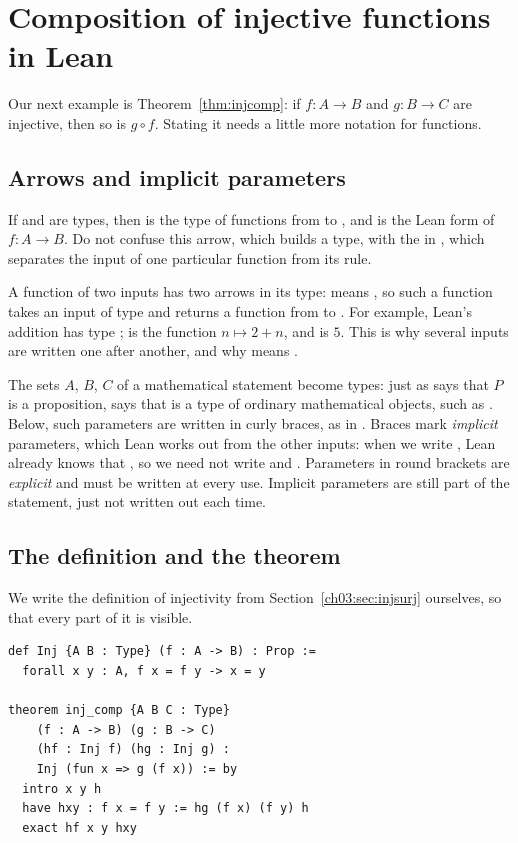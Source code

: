 \section{Composition of injective functions in Lean}\label{ch15:sec:injcomp}
Our next example is Theorem~\ref{thm:injcomp}: if $f:A\to B$ and $g:B\to C$ are injective, then so is $g\circ f$. Stating it needs a little more notation for functions.

\subsection*{Arrows and implicit parameters}
If  and  are types, then  is the type of functions from  to , and  is the Lean form of $f:A\to B$. Do not confuse this arrow, which builds a type, with the \code{=>} in , which separates the input of one particular function from its rule.

A function of two inputs has two arrows in its type:  means , so such a function takes an input of type  and returns a function from  to . For example, Lean's addition  has type ;  is the function $n\mapsto 2+n$, and  is $5$. This is why several inputs are written one after another, and why  means .

The sets $A$, $B$, $C$ of a mathematical statement become types: just as  says that $P$ is a proposition,  says that  is a type of ordinary mathematical objects, such as . Below, such parameters are written in curly braces, as in . Braces mark \emph{implicit} parameters, which Lean works out from the other inputs: when we write , Lean already knows that , so we need not write  and . Parameters in round brackets are \emph{explicit} and must be written at every use. Implicit parameters are still part of the statement, just not written out each time.

\subsection*{The definition and the theorem}
We write the definition of injectivity from Section~\ref{ch03:sec:injsurj} ourselves, so that every part of it is visible.
\par\noindent\begin{minipage}{\linewidth}
\begin{lstlisting}
def Inj {A B : Type} (f : A -> B) : Prop :=
  forall x y : A, f x = f y -> x = y

theorem inj_comp {A B C : Type}
    (f : A -> B) (g : B -> C)
    (hf : Inj f) (hg : Inj g) :
    Inj (fun x => g (f x)) := by
  intro x y h
  have hxy : f x = f y := hg (f x) (f y) h
  exact hf x y hxy
\end{lstlisting}
\end{minipage}\par

